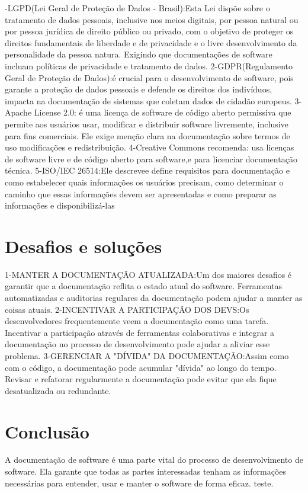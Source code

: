 \documentclass[12pt,oneside,a4paper,article]{abntex2}
\begin{document}
-LGPD(Lei Geral de Proteção de Dados - Brasil):Esta Lei dispõe sobre o tratamento de dados
pessoais, inclusive nos meios digitais, por pessoa natural ou por pessoa jurídica de direito público
ou privado, com o objetivo de proteger os direitos fundamentais de liberdade e de privacidade e o
livre desenvolvimento da personalidade
da pessoa natura. Exigindo que documentações de software incluam políticas de privacidade e
tratamento de dados.
2-GDPR(Regulamento Geral de Proteção de Dados):é crucial para o desenvolvimento de software,
pois garante a proteção de dados pessoais e defende os direitos dos indivíduos, impacta na
documentação de sistemas que coletam dados de cidadão europeus.
3-Apache License 2.0: é uma licença de software de código aberto permissiva que permite aos
usuários usar, modificar e distribuir software livremente, inclusive para fins comerciais. Ele exige
menção clara na documentação sobre termos de uso modificações e redistribuição.
4-Creative Commons recomenda: usa licenças de software livre e de código aberto para software,e
para licenciar documentação técnica.
5-ISO/IEC 26514:Ele descrevee define requisitos para documentação e como estabelecer quais
informações os usuários precisam, como determinar o caminho
que essas informações devem ser apresentadas e como preparar as informações e disponibilizá-las

\section{Desafios e soluções}
1-MANTER A DOCUMENTAÇÃO ATUALIZADA:Um dos maiores desafios é garantir que a
documentação reflita o estado atual do software.
Ferramentas automatizadas e auditorias regulares da documentação podem ajudar a manter as coisas
atuais.
2-INCENTIVAR A PARTICIPAÇÃO DOS DEVS:Os desenvolvedores frequentemente veem a
documentação como uma tarefa.
Incentivar a participação através de ferramentas colaborativas e integrar a documentação no
processo de desenvolvimento pode ajudar a aliviar esse problema.
3-GERENCIAR A "DÍVIDA" DA DOCUMENTAÇÃO:Assim como com o código, a
documentação pode acumular "dívida"
ao longo do tempo. Revisar e refatorar regularmente a documentação pode evitar que ela fique
desatualizada ou redundante.

\section{Conclusão}
A documentação de software é uma parte vital do processo de desenvolvimento de software.
Ela garante que todas as partes interessadas tenham as informações necessárias para entender,
usar e manter o software de forma eficaz.
 teste.



\end{document}
